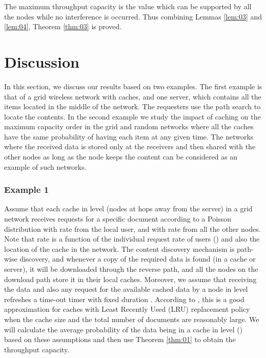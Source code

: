 \documentclass[journal]{IEEEtran}
\theoremstyle{plain}
\theoremstyle{remark}
\begin{document}
The maximum throughput capacity is the value which can be supported by all the nodes while no interference is occurred. Thus combining Lemmas \ref{lem:03} and \ref{lem:04}, Theorem \ref{thm:03} is proved.

\section{Discussion}
\label{sec:discussion}

In this section, we discuss our results based on two examples. The first example is that of a grid wireless network with  caches, and one server, which contains all the items located in the middle of the network. The requesters use the path search to locate the contents.  In the second example we study the impact of caching on the maximum capacity order in the grid and random networks where all the caches have the same probability of having each item at any given time. The networks where the received data is stored only at the receivers and then shared with the other nodes as long as the node keeps the content can be considered as an example of such networks. 

 
\subsubsection{Example 1}
\label{ex:01}

Assume that each cache in level  (nodes at  hops away from the server) in a grid network receives requests for a specific document according to a Poisson distribution with rate  from the local user, and with rate  from all the other nodes. Note that rate  is a function of the individual request rate of users () and also the location of the cache in the network. The content discovery mechanism is path-wise discovery, and whenever a copy of the required data is found (in a cache or server), it will be downloaded through the reverse path, and all the nodes on the download path store it in their local caches. Moreover, we assume that receiving the data and also any request for the available cached data by a node in level  refreshes a time-out timer with fixed duration . According to \cite{Che2002Hierarchical},  this is a good approximation for caches with Least Recently Used (LRU) replacement policy when the cache size and the total number of documents are reasonably large. We will calculate the average probability of the data being in a cache in level  () based on these assumptions and then use Theorem \ref{thm:01} to obtain the throughput capacity.
\end{document}
